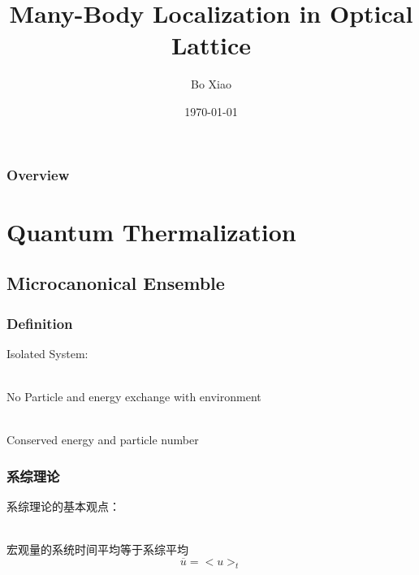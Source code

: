 \documentclass{beamer}
\title{Many-Body Localization in Optical Lattice} %
\author{Bo Xiao} %
\institute[USTC] %
{
University of Science and Technology of China \\ %
\medskip
\textit{xbustc@gmail.com} %
}
\date{\today} %
\begin{document}
\noindent
\begin{frame}
\titlepage %
\end{frame}

\begin{frame}
\frametitle{Overview} %
\tableofcontents %
\end{frame}


\section{Quantum Thermalization} %

\subsection{Microcanonical Ensemble} %

\begin{frame}
\frametitle{Definition}
Isolated System:\\~

\pause No Particle and energy exchange with environment\\~

\pause Conserved energy and particle number

\end{frame}

\begin{frame}
\frametitle{系综理论}
\noindent
系综理论的基本观点：\\~\\
\begin{block}{宏观量的系统时间平均等于系综平均}
$$\overline{u} = <u>_t$$
\end{block}
\end{frame}
\end{document}
